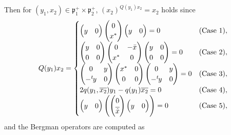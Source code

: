 \documentclass[pdftex]{sigma}
\numberwithin{equation}{section}
\newcommand{\fp}{\mathfrak{p}}
\begin{document}
Then for $(y_1,x_2)\in\fp^+_1\times\fp^+_2$, $(x_2)^{Q(y_1)x_2}=x_2$ holds since
\begin{align*}
Q(y_1)x_2=\begin{cases}
\begin{pmatrix}y&0\end{pmatrix}\begin{pmatrix}0\\x^*\end{pmatrix}\begin{pmatrix}y&0\end{pmatrix}=0& (\text{Case }1),\\
\begin{pmatrix}y&0\\0&0\end{pmatrix}\begin{pmatrix}0&-\bar{x}\\x^*&0\end{pmatrix}
\begin{pmatrix}y&0\\0&0\end{pmatrix}=0& (\text{Case }2),\\
\begin{pmatrix}0&y\\-{}^t\hspace{-1pt}y&0\end{pmatrix}
\begin{pmatrix}x^*&0\\0&0\end{pmatrix}\begin{pmatrix}0&y\\-{}^t\hspace{-1pt}y&0\end{pmatrix}=0& (\text{Case }3),\\
2q(y_1,\overline{x_2})y_1-q(y_1)\overline{x_2}=0& (\text{Case }4),\\
\begin{pmatrix}y&0\end{pmatrix}\left(\begin{pmatrix}0\\\overline{\hat{x}}\end{pmatrix}\begin{pmatrix}y&0\end{pmatrix}\right)=0& (\text{Case }5),
\end{cases}
\end{align*}
and the Bergman operators are computed as
\end{document}
